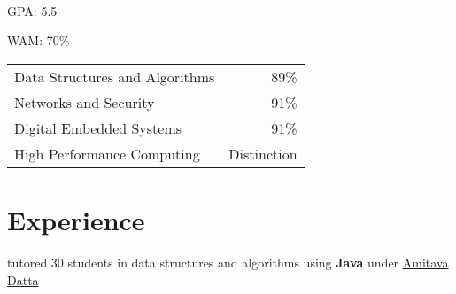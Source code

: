 \documentclass[a4paper]{style}
\begin{document}
\begin{minipage}[t]{0.54\textwidth}
\\
\begin{tightitemize}
    \item GPA\@: 5.5
    \item WAM\@: 70\%
\end{tightitemize}
\begin{tabular}{l|r}
    Data Structures and Algorithms & 89\% \\
    Networks and Security & 91\% \\
	Digital Embedded Systems & 91\% \\
    High Performance Computing & Distinction \\
\end{tabular}


\sectionspace{} %


\section{Experience}

    \vspace{-1pt}
    \begin{tightitemize}
        \item tutored 30 students in data structures and algorithms using \textbf{Java} under \href{https://research-repository.uwa.edu.au/en/persons/amitava-datta}{Amitava Datta}
    \end{tightitemize}
\sectionspace{}


\end{minipage}
\end{document}
